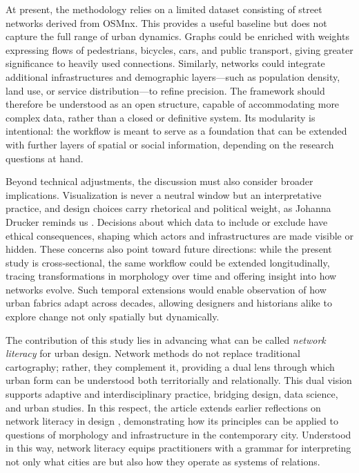 \documentclass[land,article,accept,pdftex,oneauthor]{Definitions/mdpi}
\begin{document}
{At present, the methodology relies on a limited dataset consisting of street networks derived from {OSMnx}. This provides a useful baseline but does not capture the full range of urban dynamics. Graphs could be enriched with weights expressing flows of pedestrians, bicycles, cars, and public transport, giving greater significance to heavily used connections. Similarly, networks could integrate additional infrastructures and demographic \mbox{layers---such} as population density, land use, or service distribution---to refine precision. The framework should therefore be understood as an open structure, capable of accommodating more complex data, rather than a closed or definitive system. Its modularity is intentional: the workflow is meant to serve as a foundation that can be extended with further layers of spatial or social information, depending on the research questions at hand.

Beyond technical adjustments, the discussion must also consider broader implications. Visualization is never a neutral window but an interpretative practice, and design choices carry rhetorical and political weight, as Johanna Drucker reminds us \cite{drucker_graphesis_2014}. Decisions about which data to include or exclude have ethical consequences, shaping which actors and infrastructures are made visible or hidden. These concerns also point toward future directions: while the present study is cross-sectional, the same workflow could be extended longitudinally, tracing transformations in morphology over time and offering insight into how networks evolve. Such temporal extensions would enable observation of how urban fabrics adapt across decades, allowing designers and historians alike to explore change not only spatially but dynamically.

The contribution of this study lies in advancing what can be called \textit{{network literacy}} for urban design. Network methods do not replace traditional cartography; rather, they complement it, providing a dual lens through which urban form can be understood both territorially and relationally. This dual vision supports adaptive and interdisciplinary practice, bridging design, data science, and urban studies. In this respect, the article extends earlier reflections on network literacy in design \cite{rodighiero_network_nodate}, demonstrating how its principles can be applied to questions of morphology and infrastructure in the contemporary city. Understood in this way, network literacy equips practitioners with a grammar for interpreting not only what cities are but also how they operate as systems of relations.

}
\end{document}

